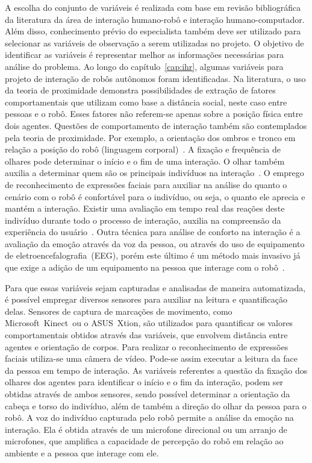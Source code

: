 A escolha do conjunto de variáveis é realizada com base em revisão bibliográfica da literatura da área de interação humano-robô e interação humano-computador. Além disso, conhecimento prévio do especialista também deve ser utilizado para selecionar as variáveis de observação a serem utilizadas no projeto. O objetivo de identificar as variáveis é representar melhor as informações necessárias para análise do problema. Ao longo do capítulo~\ref{cap:ihr}, algumas variáveis para projeto de interação de robôs autônomos foram identificadas. Na literatura, o uso da teoria de proximidade demonstra possibilidades de extração de fatores comportamentais que utilizam como base a distância social, neste caso entre pessoas e o robô. Esses fatores não referem-se apenas sobre a posição física entre dois agentes. Questões de comportamento de interação também são contemplados pela teoria de proximidade. Por exemplo, a orientação dos ombros e tronco em relação a posição do robô (linguagem corporal)~\cite{mead:2016}. A fixação e frequência de olhares pode determinar o início e o fim de uma interação. O olhar também auxilia a determinar quem são os principais indivíduos na interação~\cite{mumm:2011, srinivasan:2012}. O emprego de reconhecimento de expressões faciais para auxiliar na análise do quanto o cenário com o robô é confortável para o indivíduo, ou seja, o quanto ele aprecia e mantém a interação. Existir uma avaliação em tempo real das reações deste indivíduo durante todo o processo de interação, auxilia na compreensão da experiência do usuário~\cite{amaral:2014}. Outra técnica para análise de conforto na interação é a avaliação da emoção através da voz da pessoa, ou através do uso de equipamento de eletroencefalografia~(EEG), porém este último é um método mais invasivo já que exige a adição de um equipamento na pessoa que interage com o robô~\cite{bos:2006, lee:2014}.

Para que essas variáveis sejam capturadas e analisadas de maneira automatizada, é possível empregar diversos sensores para auxiliar na leitura e quantificação delas. Sensores de captura de marcações de movimento, como Microsoft\textregistered\ Kinect\textregistered\ ou o ASUS\textregistered\ Xtion\textregistered, são utilizados para quantificar os valores comportamentais obtidos através das variáveis, que envolvem distância entre agentes e orientação de corpos. Para realizar o reconhecimento de expressões faciais utiliza-se uma câmera de vídeo. Pode-se assim executar a leitura da face da pessoa em tempo de interação. As variáveis referentes a questão da fixação dos olhares dos agentes para identificar o início e o fim da interação, podem ser obtidas através de ambos sensores, sendo possível determinar a orientação da cabeça e torso do indivíduo, além de também a direção do olhar da pessoa para o robô. A voz do indivíduo capturada pelo robô permite a análise da emoção na interação. Ela é obtida através de um microfone direcional ou um arranjo de microfones, que amplifica a capacidade de percepção do robô em relação ao ambiente e a pessoa que interage com ele.

